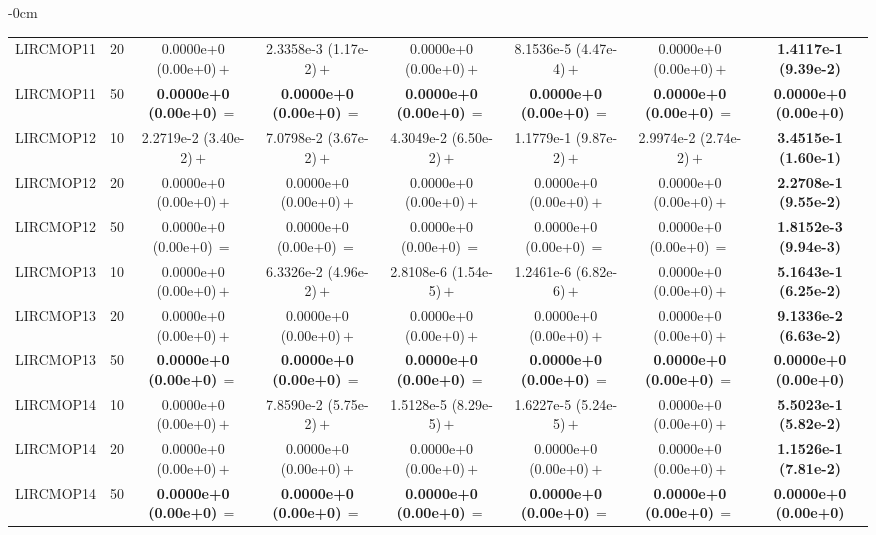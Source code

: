 \begin{table}[!htbp]
\begin{ROneBlock}
\begin{adjustwidth}{-\extralength}{0cm}
\begin{tabular*}{\linewidth}{@{\extracolsep{\fill}}llcccccc@{}}
LIRCMOP11 & 20 & 0.0000e+0 (0.00e+0)\,$+$ & 2.3358e-3 (1.17e-2)\,$+$ & 0.0000e+0 (0.00e+0)\,$+$ & 8.1536e-5 (4.47e-4)\,$+$ & 0.0000e+0 (0.00e+0)\,$+$ & \textbf{1.4117e-1 (9.39e-2)} \\
LIRCMOP11 & 50 & \textbf{0.0000e+0 (0.00e+0)}\,$=$ & \textbf{0.0000e+0 (0.00e+0)}\,$=$ & \textbf{0.0000e+0 (0.00e+0)}\,$=$ & \textbf{0.0000e+0 (0.00e+0)}\,$=$ & \textbf{0.0000e+0 (0.00e+0)}\,$=$ & \textbf{0.0000e+0 (0.00e+0)} \\
LIRCMOP12 & 10 & 2.2719e-2 (3.40e-2)\,$+$ & 7.0798e-2 (3.67e-2)\,$+$ & 4.3049e-2 (6.50e-2)\,$+$ & 1.1779e-1 (9.87e-2)\,$+$ & 2.9974e-2 (2.74e-2)\,$+$ & \textbf{3.4515e-1 (1.60e-1)} \\
LIRCMOP12 & 20 & 0.0000e+0 (0.00e+0)\,$+$ & 0.0000e+0 (0.00e+0)\,$+$ & 0.0000e+0 (0.00e+0)\,$+$ & 0.0000e+0 (0.00e+0)\,$+$ & 0.0000e+0 (0.00e+0)\,$+$ & \textbf{2.2708e-1 (9.55e-2)} \\
LIRCMOP12 & 50 & 0.0000e+0 (0.00e+0)\,$=$ & 0.0000e+0 (0.00e+0)\,$=$ & 0.0000e+0 (0.00e+0)\,$=$ & 0.0000e+0 (0.00e+0)\,$=$ & 0.0000e+0 (0.00e+0)\,$=$ & \textbf{1.8152e-3 (9.94e-3)} \\
LIRCMOP13 & 10 & 0.0000e+0 (0.00e+0)\,$+$ & 6.3326e-2 (4.96e-2)\,$+$ & 2.8108e-6 (1.54e-5)\,$+$ & 1.2461e-6 (6.82e-6)\,$+$ & 0.0000e+0 (0.00e+0)\,$+$ & \textbf{5.1643e-1 (6.25e-2)} \\
LIRCMOP13 & 20 & 0.0000e+0 (0.00e+0)\,$+$ & 0.0000e+0 (0.00e+0)\,$+$ & 0.0000e+0 (0.00e+0)\,$+$ & 0.0000e+0 (0.00e+0)\,$+$ & 0.0000e+0 (0.00e+0)\,$+$ & \textbf{9.1336e-2 (6.63e-2)} \\
LIRCMOP13 & 50 & \textbf{0.0000e+0 (0.00e+0)}\,$=$ & \textbf{0.0000e+0 (0.00e+0)}\,$=$ & \textbf{0.0000e+0 (0.00e+0)}\,$=$ & \textbf{0.0000e+0 (0.00e+0)}\,$=$ & \textbf{0.0000e+0 (0.00e+0)}\,$=$ & \textbf{0.0000e+0 (0.00e+0)} \\
LIRCMOP14 & 10 & 0.0000e+0 (0.00e+0)\,$+$ & 7.8590e-2 (5.75e-2)\,$+$ & 1.5128e-5 (8.29e-5)\,$+$ & 1.6227e-5 (5.24e-5)\,$+$ & 0.0000e+0 (0.00e+0)\,$+$ & \textbf{5.5023e-1 (5.82e-2)} \\
LIRCMOP14 & 20 & 0.0000e+0 (0.00e+0)\,$+$ & 0.0000e+0 (0.00e+0)\,$+$ & 0.0000e+0 (0.00e+0)\,$+$ & 0.0000e+0 (0.00e+0)\,$+$ & 0.0000e+0 (0.00e+0)\,$+$ & \textbf{1.1526e-1 (7.81e-2)} \\
LIRCMOP14 & 50 & \textbf{0.0000e+0 (0.00e+0)}\,$=$ & \textbf{0.0000e+0 (0.00e+0)}\,$=$ & \textbf{0.0000e+0 (0.00e+0)}\,$=$ & \textbf{0.0000e+0 (0.00e+0)}\,$=$ & \textbf{0.0000e+0 (0.00e+0)}\,$=$ & \textbf{0.0000e+0 (0.00e+0)} \\
\midrule

\end{tabular*}
\end{adjustwidth}
\end{ROneBlock}
\end{table}
